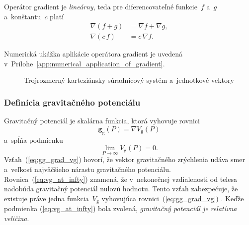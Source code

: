 \documentclass[a4paper,12pt]{book}
\newcommand{\gidx}{\mathrm g}
\let\vec\mathbf
\begin{document}
Operátor gradient je \emph{lineárny}, teda pre diferencovateľné funkcie~$f$ 
a~$g$ a~konštantu~$c$ platí
%
\begin{align}
\label{eq:gradient_additivity}
\nabla \left(f + g \right) &= \nabla f + \nabla g{,}\\
%
\label{eq:gradient_homogenity}
\nabla (c \, f) &= c \, \nabla f{.}
\end{align}

Numerická ukážka aplikácie operátora gradient je uvedená 
v~Prílohe~\ref{app:numerical_application_of_gradient}.

\begin{figure}
\centering

\caption{Trojrozmerný karteziánsky súradnicový systém a~jednotkové vektory}
\label{fig:3d_coord_system}
\end{figure}

\subsubsection{Definícia gravitačného potenciálu}

Gravitačný potenciál je skalárna funkcia, ktorá vyhovuje rovnici 
\parencite{SansoGeoidDetermination}
%
\begin{equation}
\label{eq:gg_grad_vg}
\vec g_\gidx(P) = \nabla V_\gidx(P)
\end{equation}
%
a~spĺňa podmienku
%
\begin{equation}
\label{eq:vg_at_infty}
\lim_{P \to \infty} V_\gidx(P) = 0{.}
\end{equation}
%
Vzťah~(\ref{eq:gg_grad_vg}) hovorí, že vektor gravitačného zrýchlenia udáva 
smer a~veľkosť najväčšieho nárastu gravitačného potenciálu.  
Rovnica~(\ref{eq:vg_at_infty}) znamená, že v~nekonečnej vzdialenosti od telesa 
nadobúda gravitačný potenciál nulovú hodnotu.  Tento vzťah zabezpečuje, že 
existuje práve jedna funkcia~$V_\gidx$ vyhovujúca rovnici~(\ref{eq:gg_grad_vg}) 
\parencite{SansoGeoidDetermination}.  Keďže podmienka (\ref{eq:vg_at_infty}) 
bola zvolená, \emph{gravitačný potenciál je relatívna veličina}.
\end{document}
